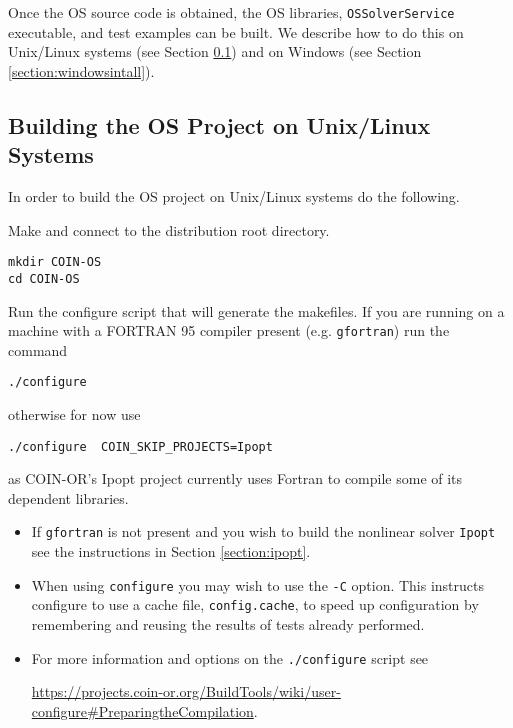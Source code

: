 \documentclass[11pt]{article}
\renewcommand{\_}{{\char"5F}}
\renewcommand{\{}{{\char"7B}}
\renewcommand{\}}{{\char"7D}}
\renewcommand{\^}{{\char"0D}}
\renewcommand{\'}{{\char"0D}}
\begin{document}
Once the OS source code is obtained, the OS libraries, {\tt OSSolverService} executable, and test examples can be built.  We describe how to do this on Unix/Linux systems (see Section \ref{section:unixbuilds})  and on Windows (see Section \ref{section:windowsintall}).

\subsection{Building the OS Project on Unix/Linux Systems}\label{section:unixbuilds}

In order to build the OS project on Unix/Linux systems do the following.

\vskip 8pt


  Make and connect to the distribution root directory.

\begin{verbatim}
mkdir COIN-OS
cd COIN-OS
\end{verbatim}


 Run the configure script that will generate the makefiles.  If you are running on a machine with a FORTRAN 95 compiler present (e.g. {\tt gfortran}) run the command

\begin{verbatim}
./configure
\end{verbatim}

\noindent otherwise for now use

\begin{verbatim}
./configure  COIN_SKIP_PROJECTS=Ipopt
\end{verbatim}
as COIN-OR's Ipopt project currently uses Fortran to compile some of its dependent libraries.

\vskip 8pt

\begin{itemize}
\item If {\tt gfortran} is not present and you  wish to build the nonlinear solver {\tt Ipopt} see the instructions in Section \ref{section:ipopt}.

\item When using {\tt configure} you may wish to use the {\tt -C} option. This   instructs configure to use a cache file, {\tt config.cache}, to speed up configuration by remembering and reusing the results of tests already performed.

\item For more information and options on the {\tt ./configure} script see


\url{https://projects.coin-or.org/BuildTools/wiki/user-configure#PreparingtheCompilation}.


\end{itemize}
\end{document}
